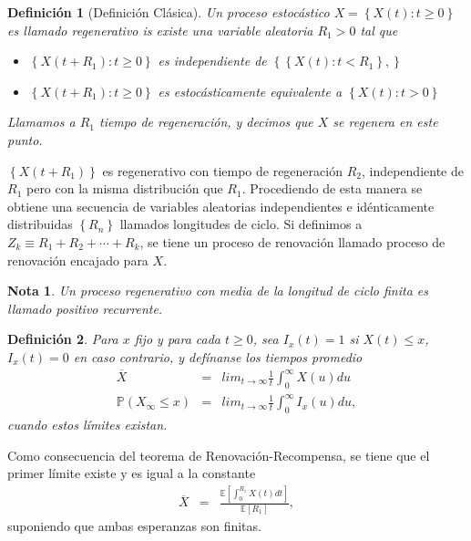 \documentclass{article}
\newtheorem{Def}{Definición}
\newtheorem{Note}{Nota}
\newcommand{\esp}{\mathbb{E}}
\newcommand{\prob}{\mathbb{P}}
\begin{document}
\begin{Def}[Definici\'on Cl\'asica]
Un proceso estoc\'astico $X=\left\{X\left(t\right):t\geq0\right\}$ es llamado regenerativo is existe una variable aleatoria $R_{1}>0$ tal que
\begin{itemize}
\item[i)] $\left\{X\left(t+R_{1}\right):t\geq0\right\}$ es independiente de $\left\{\left\{X\left(t\right):t<R_{1}\right\},\right\}$
\item[ii)] $\left\{X\left(t+R_{1}\right):t\geq0\right\}$ es estoc\'asticamente equivalente a $\left\{X\left(t\right):t>0\right\}$
\end{itemize}

Llamamos a $R_{1}$ tiempo de regeneraci\'on, y decimos que $X$ se regenera en este punto.
\end{Def}

$\left\{X\left(t+R_{1}\right)\right\}$ es regenerativo con tiempo de regeneraci\'on $R_{2}$, independiente de $R_{1}$ pero con la misma distribuci\'on que $R_{1}$. Procediendo de esta manera se obtiene una secuencia de variables aleatorias independientes e id\'enticamente distribuidas $\left\{R_{n}\right\}$ llamados longitudes de ciclo. Si definimos a $Z_{k}\equiv R_{1}+R_{2}+\cdots+R_{k}$, se tiene un proceso de renovaci\'on llamado proceso de renovaci\'on encajado para $X$.

\begin{Note}
Un proceso regenerativo con media de la longitud de ciclo finita es llamado positivo recurrente.
\end{Note}


\begin{Def}
Para $x$ fijo y para cada $t\geq0$, sea $I_{x}\left(t\right)=1$ si $X\left(t\right)\leq x$,  $I_{x}\left(t\right)=0$ en caso contrario, y def\'inanse los tiempos promedio
\begin{eqnarray*}
\overline{X}&=&lim_{t\rightarrow\infty}\frac{1}{t}\int_{0}^{\infty}X\left(u\right)du\\
\prob\left(X_{\infty}\leq x\right)&=&lim_{t\rightarrow\infty}\frac{1}{t}\int_{0}^{\infty}I_{x}\left(u\right)du,
\end{eqnarray*}
cuando estos l\'imites existan.
\end{Def}

Como consecuencia del teorema de Renovaci\'on-Recompensa, se tiene que el primer l\'imite  existe y es igual a la constante
\begin{eqnarray*}
\overline{X}&=&\frac{\esp\left[\int_{0}^{R_{1}}X\left(t\right)dt\right]}{\esp\left[R_{1}\right]},
\end{eqnarray*}
suponiendo que ambas esperanzas son finitas.
\end{document}

